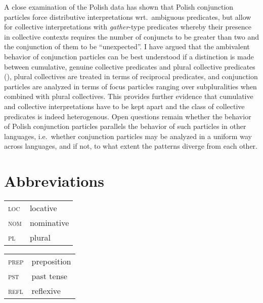 \documentclass[output=paper]{langscibook}
\begin{document}
A close examination of the Polish data has shown that Polish conjunction particles force distributive interpretations wrt.~ambiguous predicates, but allow for collective interpretations with \textit{gather}-type predicates whereby their presence in collective contexts requires the number of conjuncts to be greater than two and the conjunction of them to be ``unexpected''. I have argued that the ambivalent behavior of conjunction particles can be best understood if a distinction is made between cumulative, genuine collective predicates and plural collective predicates (\citealt{Dowty:1987, Winter:2002, Hackl:2002, Champollion:2010}), plural collectives are treated in terms of reciprocal predicates, and conjunction particles are analyzed in terms of focus particles ranging over subpluralities when combined with plural collectives. This provides further evidence that cumulative and collective interpretations have to be kept apart and the class of collective predicates is indeed heterogenous. Open questions remain whether the behavior of Polish conjunction particles parallels the behavior of such particles in other languages, i.e.~whether conjunction particles may be analyzed in a uniform way across languages, and if not, to what extent the patterns diverge from each other.

\section*{Abbreviations}

\begin{tabularx}{.5\textwidth}{@{}lX@{}}
    \textsc{loc} & locative\\
    \textsc{nom} & nominative \\
    \textsc{pl} & plural \\
        \end{tabularx}%
    \begin{tabularx}{.5\textwidth}{@{}lX@{}}
        \textsc{prep} & preposition \\
        \textsc{pst} & past tense \\
        \textsc{refl} & reflexive \\
\end{tabularx}
    
\end{document}
